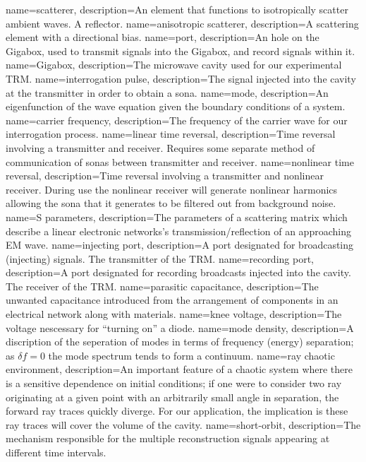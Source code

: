 {
   name=scatterer,
  description={An element that functions to isotropically scatter ambient waves. A reflector.}
}
{
   name=anisotropic scatterer,
  description={A scattering element with a directional bias.}
}
{
   name=port,
  description={An hole on the Gigabox, used to transmit signals into the Gigabox, and record signals within it.}
}
{
   name=Gigabox,
  description={The microwave cavity used for our experimental TRM.}
}
{
   name=interrogation pulse,
  description={The signal injected into the cavity at the transmitter in order to obtain a sona.}
}
{
   name=mode,
  description={An eigenfunction of the wave equation given the boundary conditions of a system.}
}
{
   name=carrier frequency,
  description={The frequency of the carrier wave for our interrogation process.}
}
{
   name=linear time reversal,
  description={Time reversal involving a transmitter and receiver.  Requires some separate method of communication of sonas between transmitter and receiver.}
}
{
   name=nonlinear time reversal,
  description={Time reversal involving a transmitter and nonlinear receiver.  During use the nonlinear receiver will generate nonlinear harmonics allowing the sona that it generates to be filtered out from background noise.}
}
{
   name=S parameters,
  description={The parameters of a scattering matrix which describe a linear electronic networks's transmission/reflection of an approaching EM wave.}
}
{
   name=injecting port,
  description={A port designated for broadcasting (injecting) signals. The transmitter of the TRM.}
}
{
   name=recording port,
  description={A port designated for recording broadcasts injected into the cavity. The receiver of the TRM.}
}
{
   name=parasitic capacitance,
  description={The unwanted capacitance introduced from the arrangement of components in an electrical network along with materials.}
}
{
   name=knee voltage,
  description={The voltage nescessary for ``turning on'' a diode.}
}
{
   name=mode density,
  description={A discription of the seperation of modes in terms of frequency (energy) separation; as $\delta f = 0$ the mode spectrum tends to form a continuum.}
}
{
   name=ray chaotic environment,
  description={An important feature of a chaotic system where there is a sensitive dependence on initial conditions; if one were to consider two ray originating at a given point with an arbitrarily small angle in separation, the forward ray traces quickly diverge. For our application, the implication is these ray traces will cover the volume of the cavity.}
}
{
   name=short-orbit,
  description={The mechanism responsible for the multiple reconstruction signals appearing at different time intervals. }
}

